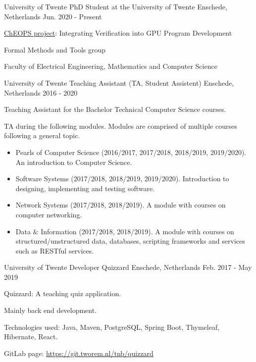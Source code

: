 
\begin{cventries}


\cventry
{University of Twente} %
{PhD Student at the University of Twente } %
{Enschede, Netherlands} %
{Jun. 2020 - Present} %
{
	\begin{cvitems} %
		\item \href{https://cheops.win.tue.nl}{ChEOPS project}: Integrating Verification into GPU Program Development
		\item Formal Methods and Tools group
		\item Faculty of Electrical Engineering, Mathematics and Computer Science 
	\end{cvitems}
}

\cventry
{University of Twente} %
{Teaching Assistant (TA, Student Assistent)} %
{Enschede, Netherlands} %
{2016 - 2020} %
{ 
\begin{cvitems} %
     	\item Teaching Assistant for the Bachelor Technical Computer Science courses.
     	\item TA during the following modules. Modules are comprised of multiple courses following a general topic. 
     	\begin{itemize}
     		\item Pearls of Computer Science (2016/2017, 2017/2018, 2018/2019, 2019/2020). An introduction to Computer Science.
     		\item Software Systems (2017/2018, 2018/2019, 2019/2020). Introduction to designing, implementing and testing software.
     		\item Network Systems (2017/2018, 2018/2019). A module with courses on computer networking.
     		\item Data \& Information (2017/2018, 2018/2019). A module with courses on structured/unstructured data, databases, scripting frameworks and services such as RESTful services.
     	\end{itemize}
\end{cvitems}
}

\cventry
{University of Twente} %
{Developer Quizzard} %
{Enschede, Netherlands} %
{Feb. 2017 - May 2019} %
{
	\begin{cvitems}
		\item Quizzard: A teaching quiz application.
		\item Mainly back end development. 
		\item Technologies used: Java, Maven, PostgreSQL, Spring Boot, Thymeleaf, Hibernate, React.
		\item GitLab page: \url{https://git.tworem.nl/tnb/quizzard}
	\end{cvitems}
}


\end{cventries}
